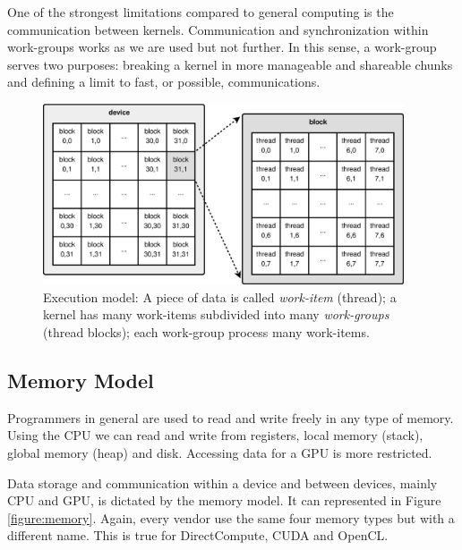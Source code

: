 \documentclass{article}
\begin{document}
One of the strongest limitations compared to general computing is the
communication between kernels. Communication and synchronization
within work-groups works as we are used but not further. In this
sense, a work-group serves two purposes: breaking a kernel in more
manageable and shareable chunks and defining a limit to fast, or
possible, communications. 

\begin{figure}[!ht]
\centering
\includegraphics[width=0.95\textwidth]{grid.eps}
\caption{Execution model: A piece of data is called {\it work-item} (thread); a kernel has many work-items subdivided into many {\it work-groups} (thread blocks); each work-group process many work-items.}
\label{figure:grid}
\end{figure}

\subsection{Memory Model}

Programmers in general are used to read and write freely in any type of memory. Using the CPU we can read and write from registers, local memory (stack), global memory (heap) and disk. Accessing data for a GPU is more restricted.

Data storage and communication within a device and between devices, mainly CPU and GPU, is dictated by the memory model. It can represented in Figure \ref{figure:memory}. Again, every vendor use the same four memory types but with a different name. This is true for DirectCompute, CUDA and OpenCL.
\end{document}
